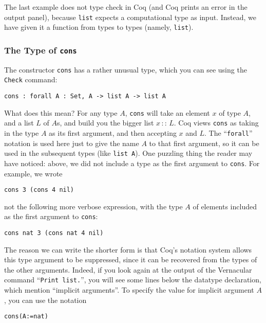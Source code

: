 \documentclass{book}[12pt]
\begin{document}
\noindent The last example does not type check in Coq (and Coq prints
an error in the output panel), because \texttt{list} expects a
computational type as input.  Instead, we have given it a function
from types to types (namely, \texttt{list}).

\subsubsection{The Type of \texttt{cons}}

The constructor \texttt{cons} has a rather unusual type, which you
can see using the \texttt{Check} command:

\begin{verbatim}
cons : forall A : Set, A -> list A -> list A
\end{verbatim}

\noindent What does this mean?  For any type $A$, \texttt{cons} will
take an element $x$ of type $A$, and a list $L$ of $A$s, and build you
the bigger list $x\, ::\, L$.  Coq views \texttt{cons} as taking in
the type $A$ as its first argument, and then accepting $x$ and $L$.
The ``\texttt{forall}'' notation is used here just to give the name
$A$ to that first argument, so it can be used in the subsequent types
(like \texttt{list A}).  One puzzling thing the reader may have
noticed: above, we did not include a type as the first argument to
\texttt{cons}.  For example, we wrote

\begin{verbatim}
cons 3 (cons 4 nil)
\end{verbatim}

\noindent not the following more verbose expression, with the type $A$
of elements included as the first argument to \texttt{cons}:

\begin{verbatim}
cons nat 3 (cons nat 4 nil)
\end{verbatim}

\noindent The reason we can write the shorter form is that Coq's
notation system allows this type argument to be suppressed, since it
can be recovered from the types of the other arguments.  Indeed, if
you look again at the output of the Vernacular command ``\texttt{Print
list.}'', you will see some lines below the datatype declaration,
which mention ``implicit arguments''.  To specify the value for
implicit argument $A$, you can use the notation

\begin{verbatim}
cons(A:=nat)
\end{verbatim}
\end{document}
